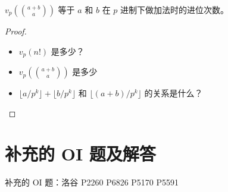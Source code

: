     \begin{theorem}[Kummer 定理]
        $v_p(\binom{a+b}{a})$ 等于 $a$ 和 $b$ 在 $p$ 进制下做加法时的进位次数。
    \end{theorem}
    \begin{proof}
        \begin{itemize}
            \item $v_p(n!)$ 是多少？
            \item $v_p(\binom{a+b}{a})$ 是多少
            \item $\lfloor a/p^k\rfloor+\lfloor b/p^k\rfloor$ 和 $\lfloor (a+b)/p^k\rfloor$ 的关系是什么？
        \end{itemize}
    \end{proof}

\section{补充的 OI 题及解答}
    补充的 OI 题：洛谷 P2260 P6826 P5170 P5591 
    
